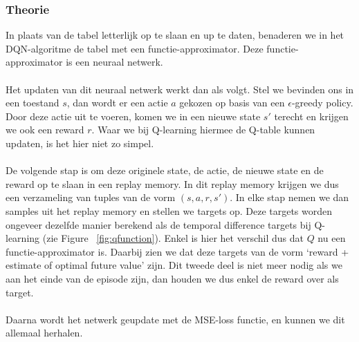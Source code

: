 \documentclass[11pt]{article}
\begin{document}
\subsubsection{Theorie}
In plaats van de tabel letterlijk op te slaan en up te daten, benaderen we in het DQN-algoritme de tabel met een functie-approximator. Deze functie-approximator is een neuraal netwerk.\\\\
Het updaten van dit neuraal netwerk werkt dan als volgt. Stel we bevinden ons in een toestand $s$, dan wordt er een actie $a$ gekozen op basis van een $\epsilon$-greedy policy. Door deze actie uit te voeren, komen we in een nieuwe state $s'$ terecht en krijgen we ook een reward $r$. Waar we bij Q-learning hiermee de Q-table kunnen updaten, is het hier niet zo simpel. \\\\
De volgende stap is om deze originele state, de actie, de nieuwe state en de reward op te slaan in een replay memory. In dit replay memory krijgen we dus een verzameling van tuples van de vorm $(s,a,r,s')$. In elke stap nemen we dan samples uit het replay memory en stellen we targets op. Deze targets worden ongeveer dezelfde manier berekend als de temporal difference targets bij Q-learning (zie Figure ~\ref{fig:qfunction}). Enkel is hier het verschil dus dat $Q$ nu een functie-approximator is. Daarbij zien we dat deze targets van de vorm `reward + estimate of optimal future value' zijn. Dit tweede deel is niet meer nodig als we aan het einde van de episode zijn, dan houden we dus enkel de reward over als target. \\\\
Daarna wordt het netwerk geupdate met de MSE-loss functie, en kunnen we dit allemaal herhalen.\\\\
\end{document}
